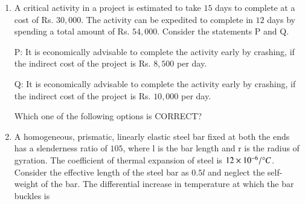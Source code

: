 \documentclass[journal,12pt,onecolumn]{article}
\theoremstyle{remark}
\begin{document}
\begin{enumerate}
    \item A critical activity in a project is estimated to take $15$ days to complete at a cost of Rs.
    $30,000$. The activity can be expedited to complete in $12$ days by spending a total
    amount of Rs. $54,000$. Consider the statements P and Q.
    
    P: It is economically advisable to complete the activity early by crashing, if the
    indirect cost of the project is Rs. $8,500$ per day.
    
    Q: It is economically advisable to complete the activity early by crashing, if the
    indirect cost of the project is Rs. $10,000$ per day.
    
    Which one of the following options is CORRECT?
    
    \hfill{}
    \begin{enumerate}
    \end{enumerate}

    \item A homogeneous, prismatic, linearly elastic steel bar fixed at both the ends has a
    slenderness ratio  of $105$, where l is the bar length and r is the radius of gyration.
    The coefficient of thermal expansion of steel is $12 \times 10^{-6} /\degree C$. Consider the effective
    length of the steel bar as $0.5l$ and neglect the self-weight of the bar.
    The differential increase in temperature  at which
    the bar buckles is
    
    \hfill{}
    \begin{enumerate}
    \end{enumerate}


\end{enumerate}
\end{document}
